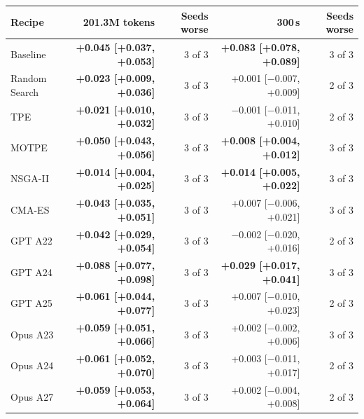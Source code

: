 \begin{tabular}{@{}lrrrr@{}}
\toprule
Recipe & 201.3M tokens & Seeds worse & 300\,s & Seeds worse \\
\midrule
Baseline & \textbf{+0.045 [+0.037, +0.053]} & 3 of 3 & \textbf{+0.083 [+0.078, +0.089]} & 3 of 3 \\
Random Search & \textbf{+0.023 [+0.009, +0.036]} & 3 of 3 & +0.001 [$-$0.007, +0.009] & 2 of 3 \\
TPE & \textbf{+0.021 [+0.010, +0.032]} & 3 of 3 & $-$0.001 [$-$0.011, +0.010] & 2 of 3 \\
MOTPE & \textbf{+0.050 [+0.043, +0.056]} & 3 of 3 & \textbf{+0.008 [+0.004, +0.012]} & 3 of 3 \\
NSGA-II & \textbf{+0.014 [+0.004, +0.025]} & 3 of 3 & \textbf{+0.014 [+0.005, +0.022]} & 3 of 3 \\
CMA-ES & \textbf{+0.043 [+0.035, +0.051]} & 3 of 3 & +0.007 [$-$0.006, +0.021] & 3 of 3 \\
GPT A22 & \textbf{+0.042 [+0.029, +0.054]} & 3 of 3 & $-$0.002 [$-$0.020, +0.016] & 2 of 3 \\
GPT A24 & \textbf{+0.088 [+0.077, +0.098]} & 3 of 3 & \textbf{+0.029 [+0.017, +0.041]} & 3 of 3 \\
GPT A25 & \textbf{+0.061 [+0.044, +0.077]} & 3 of 3 & +0.007 [$-$0.010, +0.023] & 2 of 3 \\
Opus A23 & \textbf{+0.059 [+0.051, +0.066]} & 3 of 3 & +0.002 [$-$0.002, +0.006] & 3 of 3 \\
Opus A24 & \textbf{+0.061 [+0.052, +0.070]} & 3 of 3 & +0.003 [$-$0.011, +0.017] & 2 of 3 \\
Opus A27 & \textbf{+0.059 [+0.053, +0.064]} & 3 of 3 & +0.002 [$-$0.004, +0.008] & 2 of 3 \\
\bottomrule
\end{tabular}
